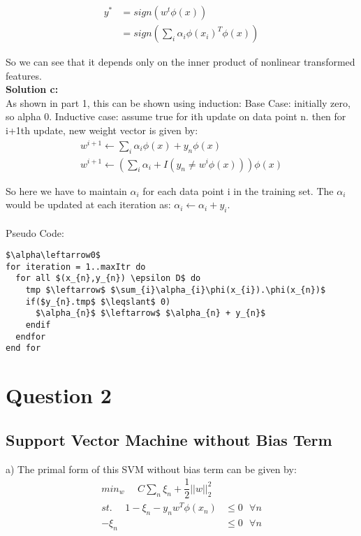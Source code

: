 \documentclass[paper=a4, fontsize=11pt]{scrartcl} %
\numberwithin{equation}{section} %
\numberwithin{figure}{section} %
\numberwithin{table}{section} %
\begin{document}
\begin{align*} 
y^{*} &= sign(w^{t}\phi(x))\\
&= sign(\sum_{i}\alpha_{i}\phi(x_{i})^{T}\phi(x))
\end{align*}

So we can see that it depends only on the inner product of nonlinear transformed features.\\

\textbf{Solution c:}\\
As shown in part 1, this can be shown using induction: Base Case: initially zero, so alpha 0. Inductive case: assume true for ith update on data point n. then for i+1th update, new weight vector is given by:
\begin{align*} 
w^{i+1}\leftarrow\sum_{i}\alpha_{i}\phi(x) + y_{n}\phi(x) \\
w^{i+1}\leftarrow(\sum_{i}\alpha_{i}+I(y_{n} \neq w^{i}\phi(x)))\phi(x)
\end{align*}

So here we have to maintain $\alpha_{i}$ for each data point i in the training set. The $\alpha_{i}$ would be updated at each iteration as: $\alpha_{i} \leftarrow \alpha_{i} + y_{i}$.\\\\
Pseudo Code:
\begin{lstlisting}[mathescape]
$\alpha\leftarrow0$
for iteration = 1..maxItr do 
  for all $(x_{n},y_{n}) \epsilon D$ do
    tmp $\leftarrow$ $\sum_{i}\alpha_{i}\phi(x_{i}).\phi(x_{n})$
    if($y_{n}.tmp$ $\leqslant$ 0)
      $\alpha_{n}$ $\leftarrow$ $\alpha_{n} + y_{n}$
    endif
  endfor
end for
\end{lstlisting}





\section{Question 2}
\subsection{Support Vector Machine without Bias Term}


a) The primal form of this SVM without bias term can be given by:
\begin{align*} 
min_{w} ~~~~~~ C\sum_{n}\xi_{n} + \dfrac{1}{2}||w||^{2}_{2}\\
st. ~~~~~~ 1-\xi_{n}-y_{n}w^{T}\phi(x_{n})&\leqslant0 ~~~ \forall n\\
-\xi_{n} &\leqslant 0 ~~~ \forall n\\
\end{align*}
\end{document}

